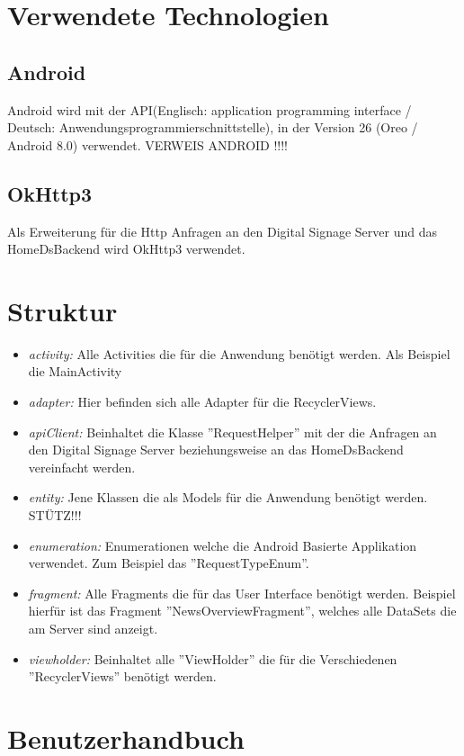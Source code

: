 \section{Verwendete Technologien}
\subsection{Android}
Android wird mit der API(Englisch: application programming interface / Deutsch: Anwendungsprogrammierschnittstelle), in der Version 26 (Oreo / Android 8.0) verwendet. 
VERWEIS ANDROID !!!!
\subsection{OkHttp3}
Als Erweiterung für die Http Anfragen an den Digital Signage Server und das HomeDsBackend wird OkHttp3 verwendet.
\section{Struktur}
\begin{itemize}
	\item {\em activity:} Alle Activities die für die Anwendung benötigt werden. Als Beispiel die MainActivity
	
	\item {\em adapter:} Hier befinden sich alle Adapter für die RecyclerViews.
	
	\item {\em apiClient:} Beinhaltet die Klasse ''RequestHelper'' mit der die Anfragen an den Digital Signage Server beziehungsweise an das HomeDsBackend vereinfacht werden.
	
	\item {\em entity:} Jene Klassen die als Models für die Anwendung benötigt werden. 
	STÜTZ!!!
	
	\item {\em enumeration:} Enumerationen welche die Android Basierte Applikation verwendet. Zum Beispiel das ''RequestTypeEnum''.
	
	\item {\em fragment:} Alle Fragments die für das User Interface benötigt werden. Beispiel hierfür ist das Fragment ''NewsOverviewFragment'', welches alle DataSets die am Server sind anzeigt.
	
	\item {\em viewholder:} Beinhaltet alle ''ViewHolder'' die für die Verschiedenen ''RecyclerViews'' benötigt werden. 		
\end{itemize}
\section{Benutzerhandbuch}
